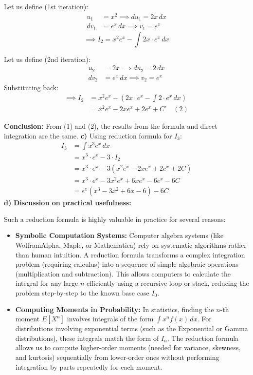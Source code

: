 \noindent Let us define (1st iteration):
\begin{align*}
    u_1 &= x^2 \implies du_1 = 2x \, dx \\
    dv_1 &= e^x \, dx \implies v_1 = e^x
\end{align*}
\[ \implies I_2 = x^2 e^x - \int 2x \cdot e^x \, dx \]

\noindent Let us define (2nd iteration):
\begin{align*}
    u_2 &= 2x \implies du_2 = 2 \, dx \\
    dv_2 &= e^x \, dx \implies v_2 = e^x
\end{align*}
Substituting back:
\begin{align*}
    \implies I_2 &= x^2 e^x - \left( 2x \cdot e^x - \int 2 \cdot e^x \, dx \right) \\
    &= x^2 e^x - 2x e^x + 2 e^x + C' \quad (2)
\end{align*}

\noindent \textbf{Conclusion:} From (1) and (2), the results from the formula and direct integration are the same.
\textbf{c)} \quad Using reduction formula for $I_3$:
\begin{align*}
    I_3 &= \int x^3 e^x \, dx \\
        &= x^3 \cdot e^x - 3 \cdot I_2 \\
        &= x^3 \cdot e^x - 3 \left( x^2 e^x - 2x e^x + 2e^x + 2C \right) \\
        &= x^3 \cdot e^x - 3x^2 e^x + 6x e^x - 6e^x - 6C \\
        &= e^x \left( x^3 - 3x^2 + 6x - 6 \right) - 6C
\end{align*}
\textbf{d)} \quad \textbf{Discussion on practical usefulness:}

Such a reduction formula is highly valuable in practice for several reasons:

\begin{itemize}
    \item \textbf{Symbolic Computation Systems:}
    Computer algebra systems (like WolframAlpha, Maple, or Mathematica) rely on systematic algorithms rather than human intuition. A reduction formula transforms a complex integration problem (requiring calculus) into a sequence of simple algebraic operations (multiplication and subtraction). This allows computers to calculate the integral for any large $n$ efficiently using a recursive loop or stack, reducing the problem step-by-step to the known base case $I_0$.

    \item \textbf{Computing Moments in Probability:}
    In statistics, finding the $n$-th moment $E[X^n]$ involves integrals of the form $\int x^n f(x) \, dx$. For distributions involving exponential terms (such as the Exponential or Gamma distributions), these integrals match the form of $I_n$. The reduction formula allows us to compute higher-order moments (needed for variance, skewness, and kurtosis) sequentially from lower-order ones without performing integration by parts repeatedly for each moment.
\end{itemize}
\pagebreak